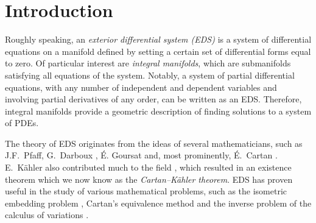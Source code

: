 \documentclass[11pt]{article}
\theoremstyle{plain}
\theoremstyle{definition}
\begin{document}


\maketitle



\section{Introduction}
Roughly speaking, an \emph{exterior differential system (EDS)} is a system of differential equations on a manifold defined by setting a certain set of differential forms equal to zero. Of particular interest are \emph{integral manifolds}, which are submanifolds satisfying all equations of the system. Notably, a system of partial differential equations, with any number of independent and dependent variables and involving partial derivatives of any order, can be written as an EDS. Therefore, integral manifolds provide a geometric description of finding solutions to a system of PDEs.

The theory of EDS originates from the ideas of several mathematicians, such as J.F.\ Pfaff, G.\ Darboux \cite{darboux1882pfaff}, {\'E}. Goursat and, most prominently, {\'E}.\ Cartan \cite{cartan1922invariant,cartan1945eds}. E.\ K{\"a}hler also contributed much to the field \cite{kahler1934ckthm}, which resulted in an existence theorem which we now know as the \emph{Cartan--K{\"a}hler theorem}. EDS has proven useful in the study of various mathematical problems, such as the isometric embedding problem \cite{bryant1991exterior}, Cartan's equivalence method \cite{olver1995equivalence} and the inverse problem of the calculus of variations \cite{anderson1992invprob}.
\end{document}
